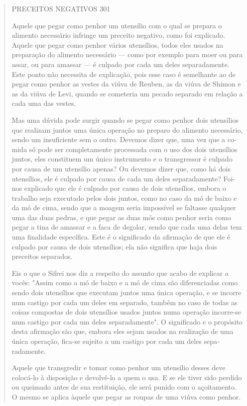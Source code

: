 \begin{quote}
PRECEITOS NEGATIVOS 301

Aquele que pegar como penhor um utensílio com o qual se prepara o
alimento necessário infringe um preceito negativo, como foi explicado.
Aque­le que pegar como penhor vários utensílios, todos eles usados na
preparação do alimento necessário --- como por exemplo para moer ou para
assar, ou para amassar --- é culpado por cada um deles separadamente.
Este ponto não necessita de explicação, pois esse caso é semelhante ao
de pegar como pe­nhor as vestes da viúva de Reuben, as da viúva de
Shimon e as da viúva de Levi, quando se cometeria um pecado separado em
relação a cada uma das vestes.

Mas uma dúvida pode surgir quando se pegar como penhor dois uten­sílios
que realizam juntos uma única operação no preparo do alimento
necessá­rio, sendo um insuficiente sem o outro. Devemos dizer que, uma
vez que a co­mida só pode ser completamente processada com o uso dos
dois utensílios jun­tos, eles constituem um único instrumento e o
transgressor é culpado por cau­sa de um utensílio apenas? Ou devemos
dizer que, como há dois utensílios, ele é culpado por causa de cada um
deles separadamente? Foi-nos explicado que ele é culpado por causa de
dois utensílios, embora o trabalho seja executado pelos dois juntos,
como no caso da mó de baixo e da mó de cima, sendo que a moagem seria
impossível se faltasse qualquer uma das duas pedras, e que pe­gar as
duas mós como penhor seria como pegar a tina de amassar e a faca de
degolar, sendo que cada uma delas tem uma finalidade específica. Este é
o sig­nificado da afirmação de que ele é culpado por causa de dois
utensílios; ela não significa que haja dois preceitos separados.

Eis o que o Sifrei nos diz a respeito do assunto que acabo de expli­car
a vocês: "Assim como a mó de baixo e a mó de cima são diferenciadas como
sendo dois utensílios que executam juntos uma única operação, e se
incorre num castigo por cada um deles em separado, também no caso de
to­das as coisas compostas de dois utensílios usados juntos numa
operação incorre-se num castigo por cada um deles separadamente". O
significado e o pro­pósito desta afirmação são que, embora eles sejam
usados na realização de uma única operação, fica-se sujeito a um castigo
por cada um deles sepa­radamente.

Aquele que transgredir e tomar como penhor um utensílio desses deve
colocá-lo à disposição e devolvê-lo a quem o usa. E se ele tiver sido
per­dido ou queimado antes de sua restituição, ele será punido com o
açoita­mento. O mesmo se aplica àquele que pegar as roupas de uma viúva
como penhor.


\end{quote}
